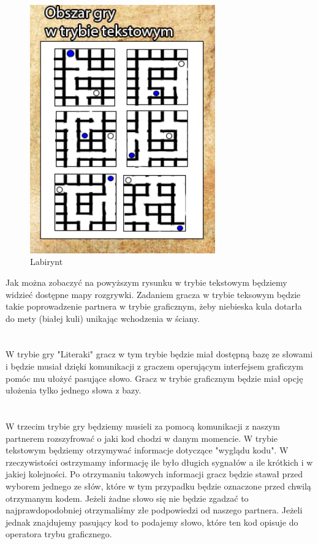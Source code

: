 \begin{figure}[!htb]
	\begin{center}
		\includegraphics[width=8cm]{rys/gra3.png}
		\caption{Labirynt}
		\label{rys:rysunek001}
	\end{center}
\end{figure}

Jak można zobaczyć na powyższym rysunku w trybie tekstowym będziemy widzieć dostępne mapy rozgrywki. Zadaniem gracza w trybie teksowym będzie takie poprowadzenie partnera w trybie graficznym, żeby niebieska kula dotarła \\do mety (białej kuli) unikając wchodzenia w ściany. 
\\
\\
\\
W trybie gry "Literaki" gracz w tym trybie będzie miał dostępną bazę ze słowami i będzie musiał dzięki komunikacji z graczem operującym interfejsem graficzym pomóc mu ułożyć pasujące słowo. Gracz w trybie graficznym będzie miał opcję ułożenia tylko jednego słowa z bazy.
 \\
 \\
 \\
 W trzecim trybie gry będziemy musieli za pomocą komunikacji z naszym partnerem rozszyfrować o jaki kod chodzi w danym momencie. W trybie tekstowym będziemy otrzymywać informacje dotyczące "wyglądu kodu". W rzeczywistości ostrzymamy informację ile było długich sygnałów a ile krótkich i w jakiej kolejności. Po otrzymaniu takowych informacji gracz będzie stawał przed wyborem jednego ze słów, które w tym przypadku będzie oznaczone przed chwilą otrzymanym kodem. Jeżeli żadne słowo się nie będzie zgadzać to najprawdopodobniej otrzymaliśmy złe podpowiedzi od naszego partnera. Jeżeli jednak znajdujemy pasujący kod to podajemy słowo, które ten kod opisuje do operatora trybu graficznego. 
 
 
 
 